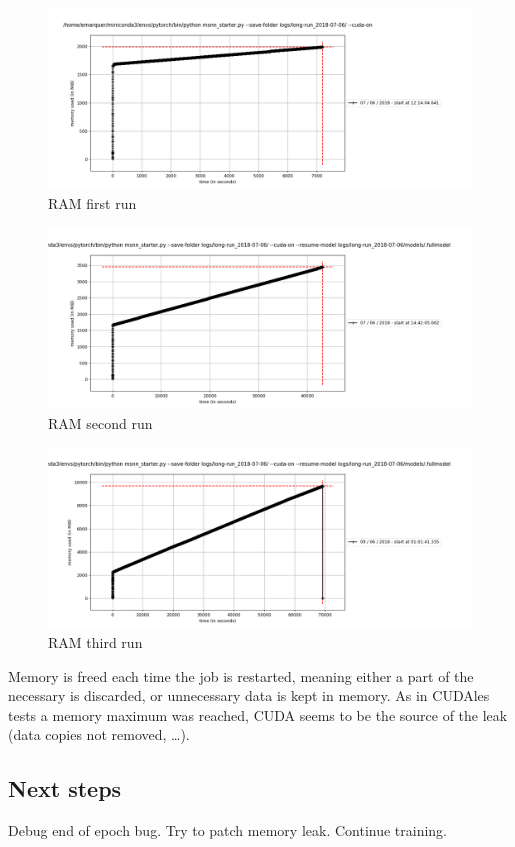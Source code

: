 \begin{figure}[H]
\centering
\includegraphics[width=\textwidth]{parts/appendix/reports-gmsnn/docs_esteban-latex/test_reports/2018-06-11/RAM.png}
\caption{RAM first run}
\end{figure}

\begin{figure}[H]
\centering
\includegraphics[width=\textwidth]{parts/appendix/reports-gmsnn/docs_esteban-latex/test_reports/2018-06-11/RAM_restart-1.png}
\caption{RAM second run}
\end{figure}

\begin{figure}[H]
\centering
\includegraphics[width=\textwidth]{parts/appendix/reports-gmsnn/docs_esteban-latex/test_reports/2018-06-11/RAM_restart-2.png}
\caption{RAM third run}
\end{figure}

Memory is freed each time the job is restarted, meaning either a part of
the necessary is discarded, or unnecessary data is kept in memory. As in
CUDAles tests a memory maximum was reached, CUDA seems to be the source
of the leak (data copies not removed, \ldots{}).

\subsection{Next steps}

Debug end of epoch bug. Try to patch memory leak. Continue training.
